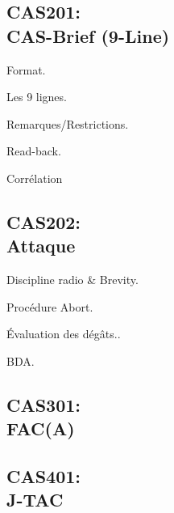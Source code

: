 \newpage


\begin{onepage}
	
	\section{CAS201:\\CAS-Brief (9-Line)}
	
	\begin{e1}
		
		\item Format.
		
		\item Les 9 lignes.
		
		\item Remarques/Restrictions.
		
		\item Read-back.
		
		\item Corrélation
		
	\end{e1}
\end{onepage}

\newpage


\begin{onepage}
	
	\section{CAS202:\\Attaque}
	
	\begin{e1}
		
		\item Discipline radio \& Brevity.
		
		\item Procédure Abort.
		
		\item Évaluation des dégâts..
		
		\item BDA.
		
	\end{e1}
\end{onepage}

\newpage


\begin{onepage}
	
	\section{CAS301:\\FAC(A)}
	
	
\end{onepage}

\newpage


\begin{onepage}
	
	\section{CAS401:\\J-TAC}
	
	
\end{onepage}